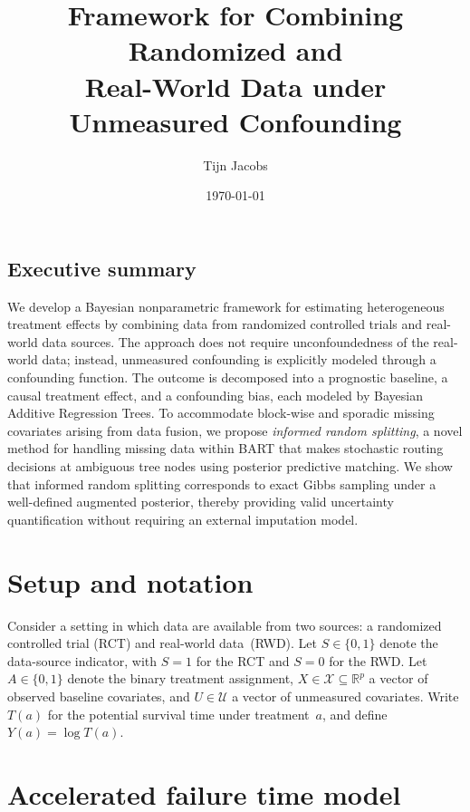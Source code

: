 \documentclass[11pt]{article}
\title{Framework for Combining Randomized and\\Real-World Data under Unmeasured Confounding}
\author{Tijn Jacobs}
\date{\today}
\theoremstyle{plain}
\theoremstyle{definition}
\theoremstyle{remark}
\newcommand{\1}{\mathds{1}}
\theoremstyle{plain}
\theoremstyle{remark}
\newcommand{\R}{\mathbb{R}}
\begin{document}
\maketitle

\subsection*{Executive summary}
\noindent
We develop a Bayesian nonparametric framework for estimating heterogeneous treatment effects by combining data from randomized controlled trials and real-world data sources. The approach does not require unconfoundedness of the real-world data; instead, unmeasured confounding is explicitly modeled through a confounding function. The outcome is decomposed into a prognostic baseline, a causal treatment effect, and a confounding bias, each modeled by Bayesian Additive Regression Trees. To accommodate block-wise and sporadic missing covariates arising from data fusion, we propose \emph{informed random splitting}, a novel method for handling missing data within BART that makes stochastic routing decisions at ambiguous tree nodes using posterior predictive matching. We show that informed random splitting corresponds to exact Gibbs sampling under a well-defined augmented posterior, thereby providing valid uncertainty quantification without requiring an external imputation model.

\section{Setup and notation}

Consider a setting in which data are available from two sources: a randomized controlled trial (RCT) and real-world data~(RWD). Let $S \in \{0,1\}$ denote the data-source indicator, with $S=1$ for the RCT and $S=0$ for the RWD. Let $A \in \{0,1\}$ denote the binary treatment assignment, $X \in \mathcal{X} \subseteq \R^p$ a vector of observed baseline covariates, and $U \in \mathcal{U}$ a vector of unmeasured covariates. Write $T(a)$ for the potential survival time under treatment~$a$, and define $Y(a) = \log T(a)$.

\section{Accelerated failure time model}
\end{document}
